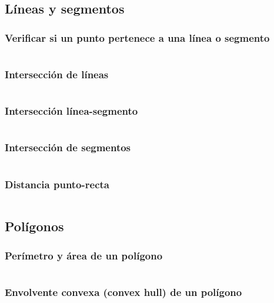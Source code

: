 \documentclass[11pt]{article}
\begin{document}
		\subsection{Líneas y segmentos}
			\subsubsection{Verificar si un punto pertenece a una línea o segmento}
			\inputminted[tabsize=2,breaklines,firstline=62,lastline=70,fontsize=\small]{c++}{geometry.cpp}
			
			\subsubsection{Intersección de líneas}
			\inputminted[tabsize=2,breaklines,firstline=72,lastline=91,fontsize=\small]{c++}{geometry.cpp}
			
			\subsubsection{Intersección línea-segmento}
			\inputminted[tabsize=2,breaklines,firstline=93,lastline=106,fontsize=\small]{c++}{geometry.cpp}
			
			\subsubsection{Intersección de segmentos}
			\inputminted[tabsize=2,breaklines,firstline=108,lastline=125,fontsize=\small]{c++}{geometry.cpp}
			
			\subsubsection{Distancia punto-recta}
			\inputminted[tabsize=2,breaklines,firstline=127,lastline=130,fontsize=\small]{c++}{geometry.cpp}
			
		\subsection{Polígonos}
			\subsubsection{Perímetro y área de un polígono}
			\inputminted[tabsize=2,breaklines,firstline=132,lastline=148,fontsize=\small]{c++}{geometry.cpp}
			
			\subsubsection{Envolvente convexa (convex hull) de un polígono}
			\inputminted[tabsize=2,breaklines,firstline=150,lastline=169,fontsize=\small]{c++}{geometry.cpp}
			
\end{document}
